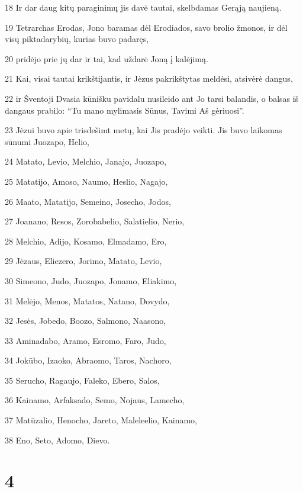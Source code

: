 \par 18 Ir dar daug kitų paraginimų jis davė tautai, skelbdamas Gerąją naujieną. 
\par 19 Tetrarchas Erodas, Jono baramas dėl Erodiados, savo brolio žmonos, ir dėl visų piktadarybių, kurias buvo padaręs, 
\par 20 pridėjo prie jų dar ir tai, kad uždarė Joną į kalėjimą. 
\par 21 Kai, visai tautai krikštijantis, ir Jėzus pakrikštytas meldėsi, atsivėrė dangus, 
\par 22 ir Šventoji Dvasia kūnišku pavidalu nusileido ant Jo tarsi balandis, o balsas iš dangaus prabilo: “Tu mano mylimasis Sūnus, Tavimi Aš gėriuosi”. 
\par 23 Jėzui buvo apie trisdešimt metų, kai Jis pradėjo veikti. Jis buvo laikomas sūnumi Juozapo, Helio, 
\par 24 Matato, Levio, Melchio, Janajo, Juozapo, 
\par 25 Matatijo, Amoso, Naumo, Heslio, Nagajo, 
\par 26 Maato, Matatijo, Semeino, Josecho, Jodos, 
\par 27 Joanano, Resos, Zorobabelio, Salatielio, Nerio, 
\par 28 Melchio, Adijo, Kosamo, Elmadamo, Ero, 
\par 29 Jėzaus, Eliezero, Jorimo, Matato, Levio, 
\par 30 Simeono, Judo, Juozapo, Jonamo, Eliakimo, 
\par 31 Melėjo, Menos, Matatos, Natano, Dovydo, 
\par 32 Jesės, Jobedo, Boozo, Salmono, Naasono, 
\par 33 Aminadabo, Aramo, Esromo, Faro, Judo, 
\par 34 Jokūbo, Izaoko, Abraomo, Taros, Nachoro, 
\par 35 Serucho, Ragaujo, Faleko, Ebero, Salos, 
\par 36 Kainamo, Arfaksado, Semo, Nojaus, Lamecho, 
\par 37 Matūzalio, Henocho, Jareto, Maleleelio, Kainamo, 
\par 38 Eno, Seto, Adomo, Dievo.



\chapter{4}


